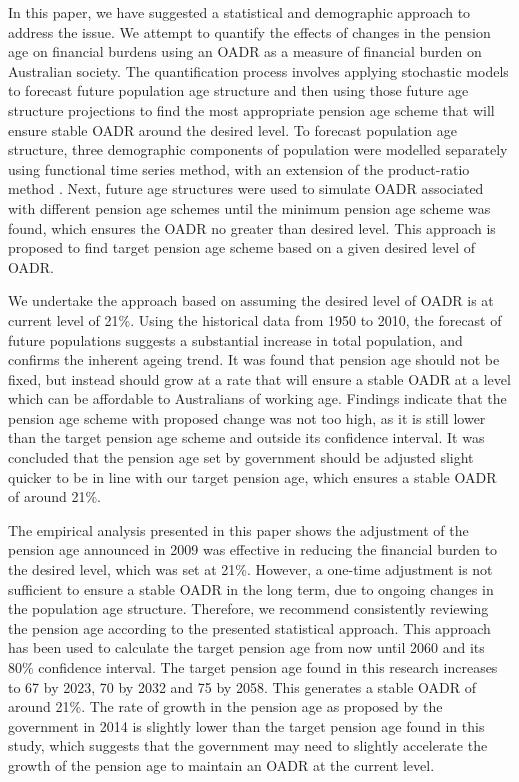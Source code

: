 \documentclass[11pt,a4paper,]{article}
\begin{document}
In this paper, we have suggested a statistical and demographic approach
to address the issue. We attempt to quantify the effects of changes in
the pension age on financial burdens using an OADR as a measure of
financial burden on Australian society. The quantification process
involves applying stochastic models to forecast future population age
structure and then using those future age structure projections to find
the most appropriate pension age scheme that will ensure stable OADR
around the desired level. To forecast population age structure, three
demographic components of population were modelled separately using
\textcite{HU07} functional time series method, with an extension of the
product-ratio method \autocite{HBY13}. Next, future age structures were
used to simulate OADR associated with different pension age schemes
until the minimum pension age scheme was found, which ensures the OADR
no greater than desired level. This approach is proposed to find target
pension age scheme based on a given desired level of OADR.

We undertake the approach based on assuming the desired level of OADR is
at current level of 21\%. Using the historical data from 1950 to 2010,
the forecast of future populations suggests a substantial increase in
total population, and confirms the inherent ageing trend. It was found
that pension age should not be fixed, but instead should grow at a rate
that will ensure a stable OADR at a level which can be affordable to
Australians of working age. Findings indicate that the pension age
scheme with proposed change was not too high, as it is still lower than
the target pension age scheme and outside its confidence interval. It
was concluded that the pension age set by government should be adjusted
slight quicker to be in line with our target pension age, which ensures
a stable OADR of around 21\%.

The empirical analysis presented in this paper shows the adjustment of
the pension age announced in 2009 was effective in reducing the
financial burden to the desired level, which was set at 21\%. However, a
one-time adjustment is not sufficient to ensure a stable OADR in the
long term, due to ongoing changes in the population age structure.
Therefore, we recommend consistently reviewing the pension age according
to the presented statistical approach. This approach has been used to
calculate the target pension age from now until 2060 and its 80\%
confidence interval. The target pension age found in this research
increases to 67 by 2023, 70 by 2032 and 75 by 2058. This generates a
stable OADR of around 21\%. The rate of growth in the pension age as
proposed by the government in 2014 is slightly lower than the target
pension age found in this study, which suggests that the government may
need to slightly accelerate the growth of the pension age to maintain an
OADR at the current level.
\end{document}

